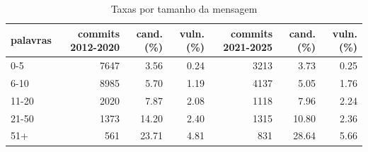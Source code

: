 \begin{table}[htbp]
\centering
\caption{Taxas por tamanho da mensagem}
\label{tab:mensagem}
\begin{tabular}{lrrrrrr}
\toprule
palavras & commits 2012-2020 & cand. (\%) & vuln. (\%) & commits 2021-2025 & cand. (\%) & vuln. (\%) \\
\midrule
0-5 & 7647 & 3.56 & 0.24 & 3213 & 3.73 & 0.25 \\
6-10 & 8985 & 5.70 & 1.19 & 4137 & 5.05 & 1.76 \\
11-20 & 2020 & 7.87 & 2.08 & 1118 & 7.96 & 2.24 \\
21-50 & 1373 & 14.20 & 2.40 & 1315 & 10.80 & 2.36 \\
51+ & 561 & 23.71 & 4.81 & 831 & 28.64 & 5.66 \\
\bottomrule
\end{tabular}
\end{table}
